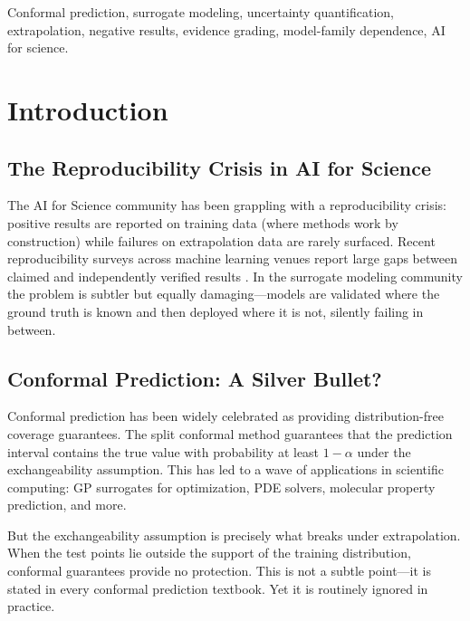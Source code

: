 \documentclass[journal]{IEEEtran}
\begin{document}
\begin{IEEEkeywords}
Conformal prediction, surrogate modeling, uncertainty quantification,
extrapolation, negative results, evidence grading, model-family dependence,
AI for science.
\end{IEEEkeywords}

\section{Introduction}

\subsection{The Reproducibility Crisis in AI for Science}

The AI for Science community has been grappling with a reproducibility
crisis: positive results are reported on training data (where methods work
by construction) while failures on extrapolation data are rarely surfaced.
Recent reproducibility surveys across machine learning venues report large
gaps between claimed and independently verified results \cite{raygun2026nature}.
In the surrogate modeling community the problem is subtler but equally
damaging---models are validated where the ground truth is known and then
deployed where it is not, silently failing in between.

\subsection{Conformal Prediction: A Silver Bullet?}

Conformal prediction \cite{vovk2005tutorial, angelopoulos2022confidence} has
been widely celebrated as providing distribution-free coverage guarantees.
The split conformal method guarantees that the prediction interval contains
the true value with probability at least $1 - \alpha$ under the exchangeability
assumption. This has led to a wave of applications in scientific computing:
GP surrogates for optimization, PDE solvers, molecular property prediction,
and more.

But the exchangeability assumption is precisely what breaks under
extrapolation. When the test points lie outside the support of the training
distribution, conformal guarantees provide no protection. This is not a
subtle point---it is stated in every conformal prediction textbook. Yet it is
routinely ignored in practice.
\end{document}
